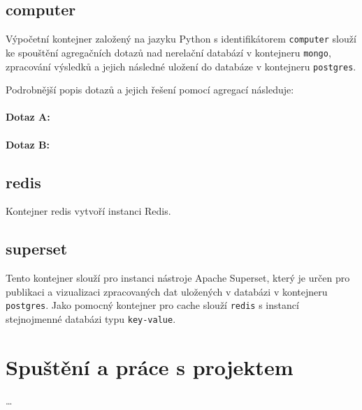 \documentclass[10pt,a4paper,titlepage]{extarticle}
\begin{document}
    \subsection{computer}

    Výpočetní kontejner založený na jazyku Python s identifikátorem \texttt{computer} slouží ke spouštění agregačních
    dotazů nad nerelační databází v kontejneru \texttt{mongo}, zpracování výsledků a jejich následné uložení do databáze
    v kontejneru \texttt{postgres}.

    Podrobnější popis dotazů a jejich řešení pomocí agregací následuje:

    \paragraph{Dotaz A:}


    \paragraph{Dotaz B:}

    \subsection{redis}

    Kontejner redis vytvoří instanci Redis.

    \subsection{superset}

    Tento kontejner slouží pro instanci nástroje Apache Superset, který je určen pro publikaci a vizualizaci
    zpracovaných dat uložených v databázi v kontejneru \texttt{postgres}. Jako pomocný kontejner pro cache slouží
    \texttt{redis} s instancí stejnojmenné databázi typu \texttt{key-value}.

    \section{Spuštění a práce s projektem}

    \ldots
\end{document}
